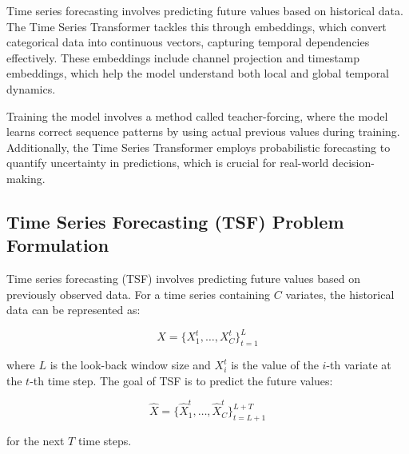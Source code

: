 Time series forecasting involves predicting future values based on historical data. The Time Series Transformer tackles this through embeddings, which convert categorical data into continuous vectors, capturing temporal dependencies effectively. These embeddings include channel projection and timestamp embeddings, which help the model understand both local and global temporal dynamics.

Training the model involves a method called teacher-forcing, where the model learns correct sequence patterns by using actual previous values during training. Additionally, the Time Series Transformer employs probabilistic forecasting to quantify uncertainty in predictions, which is crucial for real-world decision-making.

\subsection{Time Series Forecasting (TSF) Problem Formulation}
Time series forecasting (TSF) involves predicting future values based on previously observed data. For a time series containing \(C\) variates, the historical data can be represented as:

\begin{equation}
X = \{X^t_1, \ldots, X^t_C\}_{t=1}^L
\end{equation}

where \(L\) is the look-back window size and \(X^t_i\) is the value of the \(i\)-th variate at the \(t\)-th time step. The goal of TSF is to predict the future values:

\begin{equation}
\hat{X} = \{\hat{X}^t_1, \ldots, \hat{X}^t_C\}_{t=L+1}^{L+T}
\end{equation}

for the next \(T\) time steps.


